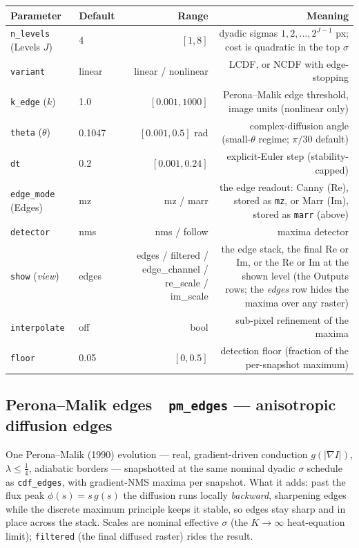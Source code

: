 \documentclass[10pt]{article}
\newcommand{\dev}[1]{\texttt{#1}}
\newcommand{\tool}[2]{#1~\textperiodcentered~\dev{#2}}
\begin{document}
\begin{longtable}{P l R N}
\toprule Parameter & Default & Range & Meaning \\ \midrule
\texttt{n\_levels} (Levels $J$) & 4 & $[1,8]$ & dyadic sigmas $1,2,\dots,2^{J-1}$ px; cost is quadratic in the top $\sigma$ \\
\texttt{variant} & linear & linear / nonlinear & LCDF, or NCDF with edge-stopping \\
\texttt{k\_edge} ($k$) & 1.0 & $[0.001,1000]$ & Perona--Malik edge threshold, image units (nonlinear only) \\
\texttt{theta} ($\theta$) & 0.1047 & $[0.001,0.5]$ rad & complex-diffusion angle (small-$\theta$ regime; $\pi/30$ default) \\
\texttt{dt} & 0.2 & $[0.001,0.24]$ & explicit-Euler step (stability-capped) \\
\texttt{edge\_mode} (Edges) & mz & mz / marr & the edge readout: Canny (Re), stored as \texttt{mz}, or Marr (Im), stored as \texttt{marr} (above) \\
\texttt{detector} & nms & nms / follow & maxima detector \\
\texttt{show} (\emph{view}) & edges & edges / filtered / edge\_channel / re\_scale / im\_scale & the edge stack, the final Re or Im, or the Re or Im at the shown level (the Outputs rows; the \emph{edges} row hides the maxima over any raster) \\
\texttt{interpolate} & off & bool & sub-pixel refinement of the maxima \\
\texttt{floor} & 0.05 & $[0,0.5]$ & detection floor (fraction of the per-snapshot maximum) \\
\bottomrule
\end{longtable}

\subsection{\tool{Perona--Malik edges}{pm\_edges} --- anisotropic diffusion edges}
One Perona--Malik (1990) evolution --- real, gradient-driven conduction
$g(|\nabla I|)$, $\lambda\le\tfrac14$, adiabatic borders --- snapshotted at the same
nominal dyadic $\sigma$ schedule as \dev{cdf\_edges}, with gradient-NMS maxima per
snapshot. What it adds: past the flux peak $\phi(s)=s\,g(s)$ the diffusion runs locally
\emph{backward}, sharpening edges while the discrete maximum principle keeps it stable, so
edges stay sharp and in place across the stack. Scales are nominal effective $\sigma$
(the $K\to\infty$ heat-equation limit); \texttt{filtered} (the final diffused raster)
rides the result.
\end{document}
